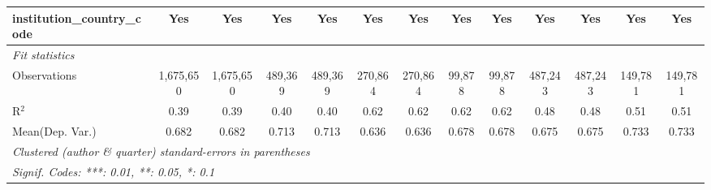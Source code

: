 \begin{tabular}{lcccccccccccc}
   institution\_country\_code               & Yes           & Yes            & Yes           & Yes            & Yes           & Yes           & Yes           & Yes           & Yes           & Yes             & Yes           & Yes\\  
   \midrule
   \emph{Fit statistics}\\
   Observations                             & 1,675,650     & 1,675,650      & 489,369       & 489,369        & 270,864       & 270,864       & 99,878        & 99,878        & 487,243       & 487,243         & 149,781       & 149,781\\  
   R$^2$                                    & 0.39          & 0.39           & 0.40          & 0.40           & 0.62          & 0.62          & 0.62          & 0.62          & 0.48          & 0.48            & 0.51          & 0.51\\  
Mean(Dep. Var.) & 0.682 & 0.682 & 0.713 & 0.713 & 0.636 & 0.636 & 0.678 & 0.678 & 0.675 & 0.675 & 0.733 & 0.733 \\
   \midrule \midrule
   \multicolumn{13}{l}{\emph{Clustered (author \& quarter) standard-errors in parentheses}}\\
   \multicolumn{13}{l}{\emph{Signif. Codes: ***: 0.01, **: 0.05, *: 0.1}}\\
\end{tabular}
\par\endgroup
